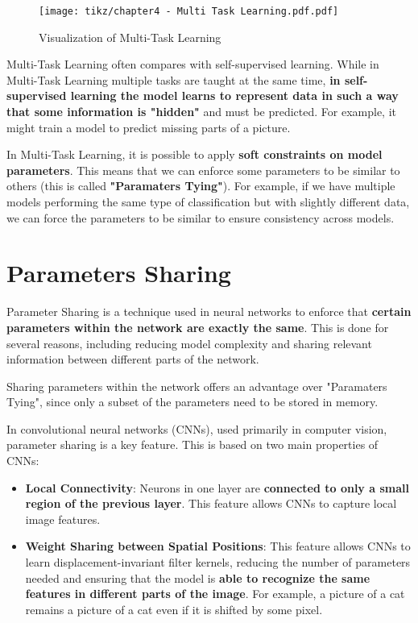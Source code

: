 \begin{figure}[!htbp]
    \centering
    \texttt{[image: tikz/chapter4 - Multi Task Learning.pdf.pdf]} 
    \caption{Visualization of Multi-Task Learning}
\end{figure}

Multi-Task Learning often compares with self-supervised learning. While in Multi-Task Learning multiple tasks are taught at the same time, \textbf{in self-supervised learning the model learns to represent data in such a way that some information is "hidden"} and must be predicted. For example, it might train a model to predict missing parts of a picture.

In Multi-Task Learning, it is possible to apply \textbf{soft constraints on model parameters}. This means that we can enforce some parameters to be similar to others (this is called \textbf{"Paramaters Tying"}). For example, if we have multiple models performing the same type of classification but with slightly different data, we can force the parameters to be similar to ensure consistency across models.

\section{Parameters Sharing}
\label{c4:parameterSharing}
Parameter Sharing is a technique used in neural networks to enforce that \textbf{certain parameters within the network are exactly the same}. This is done for several reasons, including reducing model complexity and sharing relevant information between different parts of the network.

Sharing parameters within the network offers an advantage over "Paramaters Tying", since only a subset of the parameters need to be stored in memory.

In convolutional neural networks (CNNs), used primarily in computer vision, parameter sharing is a key feature. This is based on two main properties of CNNs:

\begin{itemize}
    \item \textbf{Local Connectivity}: Neurons in one layer are \textbf{connected to only a small region of the previous layer}. This feature allows CNNs to capture local image features.
    \item \textbf{Weight Sharing between Spatial Positions}: This feature allows CNNs to learn displacement-invariant filter kernels, reducing the number of parameters needed and ensuring that the model is \textbf{able to recognize the same features in different parts of the image}. For example, a picture of a cat remains a picture of a cat even if it is shifted by some pixel. 
\end{itemize}

